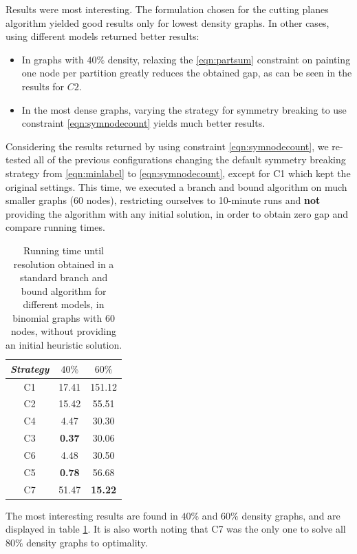 Results were most interesting. The formulation chosen for the cutting planes algorithm yielded good results only for lowest density graphs. In other cases, using different models returned better results:
\begin{itemize}
\item In graphs with $40\%$ density, relaxing the \ref{eqn:partsum} constraint on painting one node per partition greatly reduces the obtained gap, as can be seen in the results for $C2$.
\item In the most dense graphs, varying the strategy for symmetry breaking to use constraint \ref{eqn:symnodecount} yields much better results.
\end{itemize}

Considering the results returned by using constraint \ref{eqn:symnodecount}, we re-tested all of the previous configurations changing the default symmetry breaking strategy from \ref{eqn:minlabel} to \ref{eqn:symnodecount}, except for C1 which kept the original settings. This time, we executed a branch and bound algorithm on much smaller graphs (60 nodes), restricting ourselves to 10-minute runs and \textbf{not} providing the algorithm with any initial solution, in order to obtain zero gap and compare running times.

\begin{table}
\centering

\begin{tabular}{|c|c|c|}
\hline
\textit{Strategy} & {$40\%$} & {$60\%$}
\\
\hline
C1 & 17.41 & 151.12
\\
C2 & 15.42 & 55.51
\\
C4 & 4.47 & 30.30
\\
C3 & \textbf{0.37} & 30.06
\\
C6 & 4.48 & 30.50
\\
C5 & \textbf{0.78} & 56.68
\\
C7 & 51.47 & \textbf{15.22}
\\
\hline 
 \end{tabular}

\caption{Running time until resolution obtained in a standard branch and bound algorithm for different models, in binomial graphs with 60 nodes, without providing an initial heuristic solution.}
\label{table:models:bnb60}

\end{table}

The most interesting results are found in $40\%$ and $60\%$ density graphs, and are displayed in table \ref{table:models:bnb60}. It is also worth noting that C7 was the only one to solve all $80\%$ density graphs to optimality.

